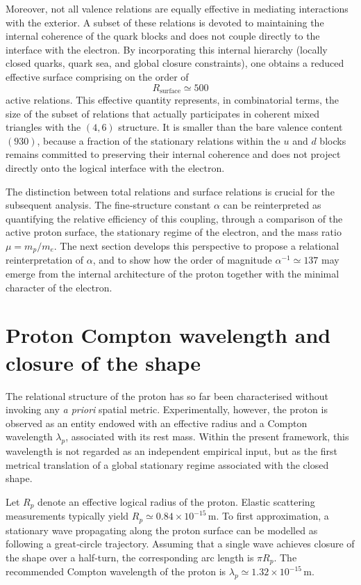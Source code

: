 \documentclass[11pt,a4paper]{article}
\begin{document}
Moreover, not all valence relations are equally effective in mediating interactions with the exterior. A subset of these relations is devoted to maintaining the internal coherence of the quark blocks and does not couple directly to the interface with the electron. By incorporating this internal hierarchy (locally closed quarks, quark sea, and global closure constraints), one obtains a reduced effective surface comprising on the order of
\[
R_{\mathrm{surface}} \simeq 500
\]
active relations. This effective quantity represents, in combinatorial terms, the size of the subset of relations that actually participates in coherent mixed triangles with the \((4,6)\) structure. It is smaller than the bare valence content \((930)\), because a fraction of the stationary relations within the \(u\) and \(d\) blocks remains committed to preserving their internal coherence and does not project directly onto the logical interface with the electron.

The distinction between total relations and surface relations is crucial for the subsequent analysis. The fine‑structure constant \(\alpha\) can be reinterpreted as quantifying the relative efficiency of this coupling, through a comparison of the active proton surface, the stationary regime of the electron, and the mass ratio \(\mu = m_p/m_e\). The next section develops this perspective to propose a relational reinterpretation of \(\alpha\), and to show how the order of magnitude \(\alpha^{-1} \simeq 137\) may emerge from the internal architecture of the proton together with the minimal character of the electron.

\section{Proton Compton wavelength and closure of the shape}

The relational structure of the proton has so far been characterised without invoking any \emph{a priori} spatial metric. Experimentally, however, the proton is observed as an entity endowed with an effective radius and a Compton wavelength \(\lambda_p\), associated with its rest mass. Within the present framework, this wavelength is not regarded as an independent empirical input, but as the first metrical translation of a global stationary regime associated with the closed shape.

Let \(R_p\) denote an effective logical radius of the proton. Elastic scattering measurements typically yield \(R_p \simeq 0.84 \times 10^{-15}\,\mathrm{m}\). To first approximation, a stationary wave propagating along the proton surface can be modelled as following a great‑circle trajectory. Assuming that a single wave achieves closure of the shape over a half‑turn, the corresponding arc length is \(\pi R_p\). The recommended Compton wavelength of the proton is \(\lambda_p \simeq 1.32 \times 10^{-15}\,\mathrm{m}\).
\end{document}
